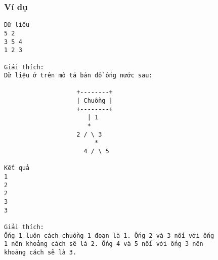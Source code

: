 \subsubsection{   Ví dụ  }
\begin{verbatim}
Dữ liệu
5 2
3 5 4
1 2 3

Giải thích:
Dữ liệu ở trên mô tả bản đồ ống nước sau:

                    +--------+
                    | Chuồng |
                    +--------+
                       | 1
                       *
                    2 / \ 3
                         *
                      4 / \ 5

Kết quả
1
2
2
3
3

Giải thích:
Ống 1 luôn cách chuồng 1 đoạn là 1. Ống 2 và 3 nối với ống 
1 nên khoảng cách sẽ là 2. Ống 4 và 5 nối với ống 3 nên 
khoảng cách sẽ là 3.
\end{verbatim}